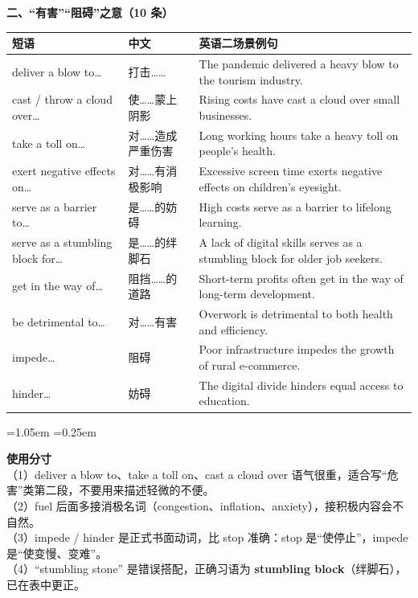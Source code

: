 \documentclass[11pt,a4paper]{ctexart}
\newcommand{\kw}[1]{{\bfseries\color{accent}#1}}
\newenvironment{note}{%
  \par\addvspace{5pt}%
  \begin{list}{}{\leftmargin=1.05em \rightmargin=0.25em \listparindent=0pt
    \itemindent=0pt \topsep=0pt \parsep=2pt \itemsep=2pt \partopsep=0pt}%
  \item\relax\small\color{ink}%
}{%
  \end{list}\addvspace{5pt}%
}
\begin{document}
\par\addvspace{5pt}\noindent\textbf{二、“有害”“阻碍”之意（10 条）}\par\addvspace{2pt}
\begin{longtable}{L{4.8cm}L{2.8cm}L{7.8cm}}
\toprule
\textbf{短语} & \textbf{中文} & \textbf{英语二场景例句} \\
\midrule
\endhead
deliver a blow to\ldots & 打击…… & The pandemic delivered a heavy blow to the tourism industry. \\
cast / throw a cloud over\ldots & 使……蒙上阴影 & Rising costs have cast a cloud over small businesses. \\
take a toll on\ldots & 对……造成严重伤害 & Long working hours take a heavy toll on people's health. \\
exert negative effects on\ldots & 对……有消极影响 & Excessive screen time exerts negative effects on children's eyesight. \\
serve as a barrier to\ldots & 是……的妨碍 & High costs serve as a barrier to lifelong learning. \\
serve as a stumbling block for\ldots & 是……的绊脚石 & A lack of digital skills serves as a stumbling block for older job seekers. \\
get in the way of\ldots & 阻挡……的道路 & Short-term profits often get in the way of long-term development. \\
be detrimental to\ldots & 对……有害 & Overwork is detrimental to both health and efficiency. \\
impede\ldots & 阻碍 & Poor infrastructure impedes the growth of rural e-commerce. \\
hinder\ldots & 妨碍 & The digital divide hinders equal access to education. \\
\bottomrule
\end{longtable}

\begin{note}
\textbf{使用分寸}\\
（1）deliver a blow to、take a toll on、cast a cloud over 语气很重，适合写“危害”类第二段，不要用来描述轻微的不便。\\
（2）fuel 后面多接消极名词（congestion、inflation、anxiety），接积极内容会不自然。\\
（3）impede / hinder 是正式书面动词，比 stop 准确：stop 是“使停止”，impede 是“使变慢、变难”。\\
（4）“stumbling stone” 是错误搭配，正确习语为 \kw{stumbling block}（绊脚石），已在表中更正。
\end{note}
\end{document}
